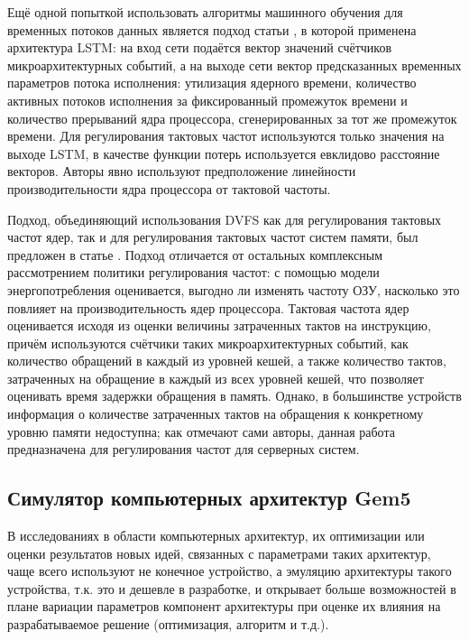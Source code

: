     Ещё одной попыткой использовать алгоритмы машинного обучения для временных потоков данных
    является подход статьи \cite{thethi2023power}, в которой применена архитектура LSTM:
    на вход сети подаётся вектор значений счётчиков микроархитектурных событий, а на выходе
    сети вектор предсказанных временных параметров потока исполнения: утилизация ядерного времени,
    количество активных потоков исполнения за фиксированный промежуток времени и количество прерываний
    ядра процессора, сгенерированных за тот же промежуток времени. Для регулирования тактовых частот
    используются только значения на выходе LSTM, в качестве функции потерь используется евклидово
    расстояние векторов. Авторы явно используют предположение линейности производительности ядра
    процессора от тактовой частоты.

    Подход, объединяющий использования DVFS как для регулирования тактовых частот ядер, так и для
    регулирования тактовых частот систем памяти, был предложен в статье \cite{deng2012coscale}.
    Подход отличается от остальных комплексным рассмотрением политики регулирования частот:
    с помощью модели энергопотребления оценивается, выгодно ли изменять частоту ОЗУ, насколько это
    повлияет на производительность ядер процессора. Тактовая частота ядер оценивается исходя из
    оценки величины затраченных тактов на инструкцию, причём используются счётчики таких
    микроархитектурных событий, как количество обращений в каждый из уровней кешей, а также
    количество тактов, затраченных на обращение в каждый из всех уровней кешей, что позволяет
    оценивать время задержки обращения в память. Однако, в большинстве устройств информация о
    количестве затраченных тактов на обращения к конкретному уровню памяти недоступна;
    как отмечают сами авторы, данная работа предназначена для регулирования частот для серверных
    систем.

\subsection{Симулятор компьютерных архитектур Gem5}

    В исследованиях в области компьютерных архитектур, их оптимизации или оценки результатов новых идей,
    связанных с параметрами таких архитектур, чаще всего используют не конечное устройство, а эмуляцию
    архитектуры такого устройства, т.к. это и дешевле в разработке,
    и открывает больше возможностей в плане вариации параметров компонент архитектуры при оценке
    их влияния на разрабатываемое решение (оптимизация, алгоритм и т.д.).

